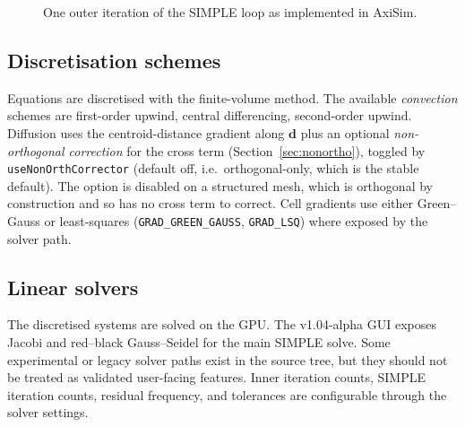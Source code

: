 \documentclass[11pt]{article}
\begin{document}
\begin{figure}[h]
\centering
{}
\caption{One outer iteration of the SIMPLE loop as implemented in AxiSim.}
\label{fig:simple}
\end{figure}

\subsection{Discretisation schemes}
Equations are discretised with the finite-volume method. The available
\emph{convection} schemes are first-order upwind, central differencing, second-order
upwind. Diffusion uses the centroid-distance gradient along $\mathbf{d}$ plus an
optional \emph{non-orthogonal correction} for the cross term
(Section~\ref{sec:nonortho}), toggled by \texttt{useNonOrthCorrector} (default off,
i.e.\ orthogonal-only, which is the stable default). The option is disabled on a
structured mesh, which is orthogonal by construction and so has no cross term to
correct. Cell gradients use either Green--Gauss or least-squares
(\texttt{GRAD\_GREEN\_GAUSS}, \texttt{GRAD\_LSQ}) where exposed by the solver path.

\subsection{Linear solvers}
The discretised systems are solved on the GPU. The v1.04-alpha GUI exposes Jacobi and
red--black Gauss--Seidel for the main SIMPLE solve. Some experimental or legacy solver
paths exist in the source tree, but they should not be treated as validated user-facing
features. Inner iteration counts, SIMPLE iteration counts, residual frequency, and
tolerances are configurable through the solver settings.
\end{document}
